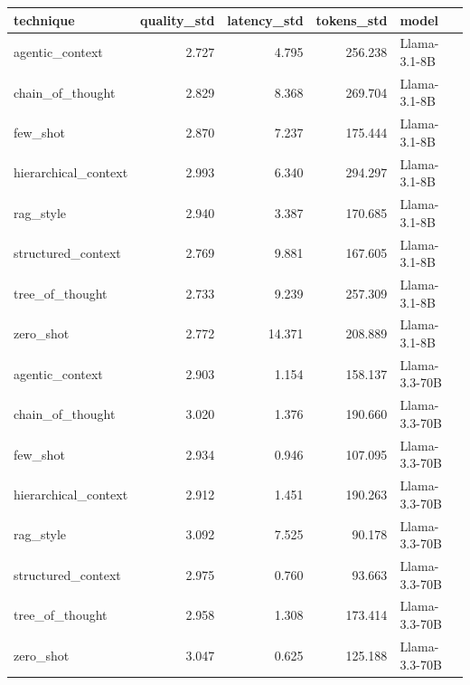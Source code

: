 \begin{tabular}{lrrrl}
\toprule
technique & quality_std & latency_std & tokens_std & model \\
\midrule
agentic_context & 2.727 & 4.795 & 256.238 & Llama-3.1-8B \\
chain_of_thought & 2.829 & 8.368 & 269.704 & Llama-3.1-8B \\
few_shot & 2.870 & 7.237 & 175.444 & Llama-3.1-8B \\
hierarchical_context & 2.993 & 6.340 & 294.297 & Llama-3.1-8B \\
rag_style & 2.940 & 3.387 & 170.685 & Llama-3.1-8B \\
structured_context & 2.769 & 9.881 & 167.605 & Llama-3.1-8B \\
tree_of_thought & 2.733 & 9.239 & 257.309 & Llama-3.1-8B \\
zero_shot & 2.772 & 14.371 & 208.889 & Llama-3.1-8B \\
agentic_context & 2.903 & 1.154 & 158.137 & Llama-3.3-70B \\
chain_of_thought & 3.020 & 1.376 & 190.660 & Llama-3.3-70B \\
few_shot & 2.934 & 0.946 & 107.095 & Llama-3.3-70B \\
hierarchical_context & 2.912 & 1.451 & 190.263 & Llama-3.3-70B \\
rag_style & 3.092 & 7.525 & 90.178 & Llama-3.3-70B \\
structured_context & 2.975 & 0.760 & 93.663 & Llama-3.3-70B \\
tree_of_thought & 2.958 & 1.308 & 173.414 & Llama-3.3-70B \\
zero_shot & 3.047 & 0.625 & 125.188 & Llama-3.3-70B \\
\bottomrule
\end{tabular}
